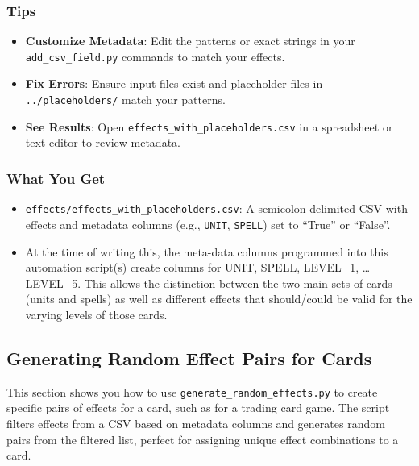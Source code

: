 \subsubsection{Tips}
\begin{itemize}
	\item \textbf{Customize Metadata}: Edit the patterns or exact strings in your \texttt{add\_csv\_field.py} commands to match your effects.
	\item \textbf{Fix Errors}: Ensure input files exist and placeholder files in \texttt{../placeholders/} match your patterns.
	\item \textbf{See Results}: Open \texttt{effects\_with\_placeholders.csv} in a spreadsheet or text editor to review metadata.
\end{itemize}

\subsubsection{What You Get}
\begin{itemize}
	\item \texttt{effects/effects\_with\_placeholders.csv}: A semicolon-delimited CSV with effects and metadata columns (e.g., \texttt{UNIT}, \texttt{SPELL}) set to ``True'' or ``False''.
	\item At the time of writing this, the meta-data columns programmed into this automation script(s) create columns for UNIT, SPELL, LEVEL\_1, \dots LEVEL\_5. This allows the distinction between the two main sets of cards (units and spells) as well as different effects that should/could be valid for the varying levels of those cards.
\end{itemize}
















\subsection{Generating Random Effect Pairs for Cards}

This section shows you how to use \texttt{generate\_random\_effects.py} to create specific pairs of effects for a card, such as for a trading card game. The script filters effects from a CSV based on metadata columns and generates random pairs from the filtered list, perfect for assigning unique effect combinations to a card.

